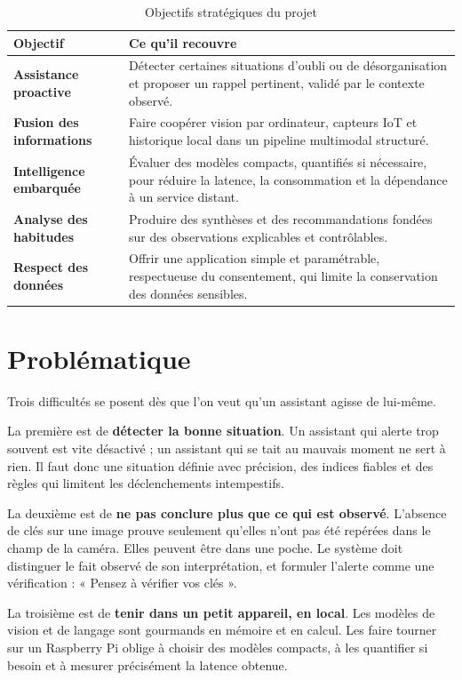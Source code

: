 \begin{table}[H]
  \centering
  \small
  \begin{tabularx}{\linewidth}{>{\bfseries}p{4.2cm}X}
    \toprule
    Objectif & Ce qu'il recouvre \\
    \midrule
    Assistance proactive & Détecter certaines situations d'oubli ou de désorganisation et proposer un rappel pertinent, validé par le contexte observé. \\
    Fusion des informations & Faire coopérer vision par ordinateur, capteurs IoT et historique local dans un pipeline multimodal structuré. \\
    Intelligence embarquée & Évaluer des modèles compacts, quantifiés si nécessaire, pour réduire la latence, la consommation et la dépendance à un service distant. \\
    Analyse des habitudes & Produire des synthèses et des recommandations fondées sur des observations explicables et contrôlables. \\
    Respect des données & Offrir une application simple et paramétrable, respectueuse du consentement, qui limite la conservation des données sensibles. \\
    \bottomrule
  \end{tabularx}
  \caption{Objectifs stratégiques du projet}
  \label{tab:objectifs}
\end{table}

\section{Problématique}

Trois difficultés se posent dès que l'on veut qu'un assistant agisse de lui-même.

La première est de \textbf{détecter la bonne situation}. Un assistant qui alerte trop souvent est vite désactivé ;
un assistant qui se tait au mauvais moment ne sert à rien. Il faut donc une situation définie avec précision, des
indices fiables et des règles qui limitent les déclenchements intempestifs.

La deuxième est de \textbf{ne pas conclure plus que ce qui est observé}. L'absence de clés sur une image prouve
seulement qu'elles n'ont pas été repérées dans le champ de la caméra. Elles peuvent être dans une poche. Le système
doit distinguer le fait observé de son interprétation, et formuler l'alerte comme une vérification : « Pensez à
vérifier vos clés ».

La troisième est de \textbf{tenir dans un petit appareil, en local}. Les modèles de vision et de langage sont
gourmands en mémoire et en calcul. Les faire tourner sur un Raspberry Pi oblige à choisir des modèles compacts, à
les quantifier si besoin et à mesurer précisément la latence obtenue.

